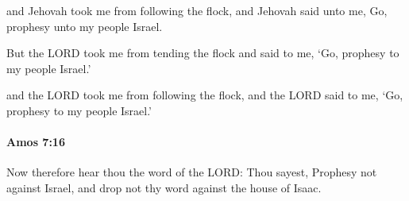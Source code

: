 			\begin{versebox}
					\item[BHS] 
					\item[LXX] 
					\item[ASV] and Jehovah took me from following the flock, and Jehovah said unto me, Go, prophesy unto my people Israel.
					\item[NIV] But the LORD took me from tending the flock and said to me, ‘Go, prophesy to my people Israel.’
					\item[NRSV] and the LORD took me from following the flock, and the LORD said to me, ‘Go, prophesy to my people Israel.’
			\end{versebox}

		\paragraph{Amos 7:16} %
			\label{AMOS-7-16}

			Now therefore hear thou the word of the LORD: Thou sayest, Prophesy not against Israel, and drop not thy word against the house of Isaac.

